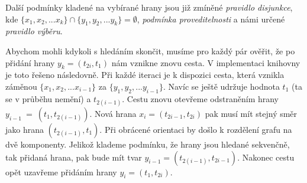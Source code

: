 \documentclass[
  biblatex,
  figures=false,
  glossaries,
  index
]{kidiplom}
\begin{document}
Další podmínky kladené na vybírané hrany jsou již zmíněné \textit{pravidlo disjunkce}, kde $\{x_1, x_2, ... x_k\} \cap \{y_1, y_2, ... y_k\} = \emptyset$, \textit{podmínka proveditelnosti} a námi určené \textit{pravidlo výběru}.

Abychom mohli kdykoli s hledáním skončit, musíme pro každý pár ověřit, že po přidání hrany $y_k = (t_{2i}, t_1)$ nám vznikne znovu cesta. V implementaci knihovny je toto řešeno následovně. Při každé iteraci je k dispozici cesta, která vznikla záměnou $\{x_1, x_2, ... x_{i-1}\}$ za $\{y_1, y_2, ... y_{i-1}\}$. Navíc se ještě udržuje hodnota $t_1$ (ta se v průběhu nemění) a $t_{2(i-1)}$. Cestu znovu otevřeme odstraněním hrany $y_{i-1}~=~(t_1, t_{2(i-1)})$. Nová hrana $x_i = (t_{2i-1}, t_{2i})$ pak musí mít stejný směr jako hrana $(t_{2(i-1)}, t_1)$. Při obrácené orientaci by došlo k rozdělení grafu na dvě komponenty. Jelikož klademe podmínku, že hrany jsou hledané sekvenčně, tak přidaná hrana, pak bude mít tvar $y_{i-1} = (t_{2(i-1)}, t_{2i-1})$. Nakonec cestu opět uzavřeme přidáním hrany $y_i = (t_1, t_{2i})$.
\end{document}

